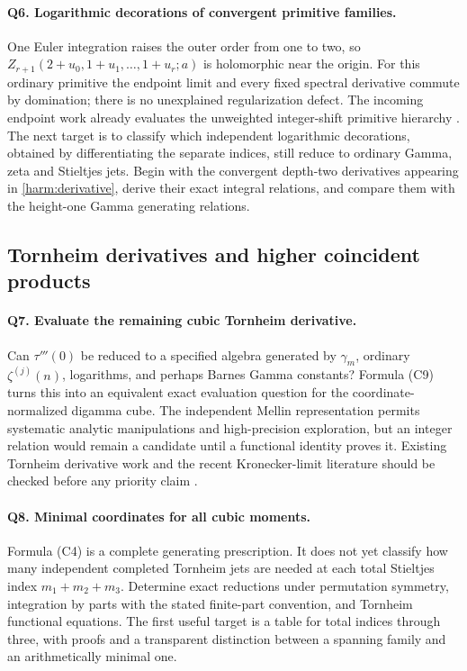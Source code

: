 \documentclass[11pt,letterpaper]{article}
\numberwithin{equation}{section}
\theoremstyle{definition}
\theoremstyle{remark}
\begin{document}
\paragraph{Q6. Logarithmic decorations of convergent primitive families.}
One Euler integration raises the outer order from one to two, so
$Z_{r+1}(2+u_0,1+u_1,\ldots,1+u_r;a)$ is holomorphic near the origin.
For this ordinary primitive the endpoint limit and every fixed
spectral derivative commute by domination; there is no unexplained
regularization defect. The incoming endpoint work already evaluates
the unweighted integer-shift primitive hierarchy
\cite{repoendpoint}. The next target is to classify which independent
logarithmic decorations, obtained by differentiating the separate
indices, still reduce to ordinary Gamma, zeta and Stieltjes jets.
Begin with the convergent depth-two derivatives appearing in
\eqref{harm:derivative}, derive their exact integral relations, and
compare them with the height-one Gamma generating relations.

\subsection{Tornheim derivatives and higher coincident products}

\paragraph{Q7. Evaluate the remaining cubic Tornheim derivative.}
Can $\tau'''(0)$ be reduced to a specified algebra generated by
$\gamma_m$, ordinary $\zeta^{(j)}(n)$, logarithms, and perhaps Barnes
Gamma constants? Formula (C9) turns this into an equivalent exact
evaluation question for the coordinate-normalized digamma cube.
The independent Mellin representation permits systematic analytic
manipulations and high-precision exploration, but an integer relation
would remain a candidate until a functional identity proves it.
Existing Tornheim derivative work and the recent Kronecker-limit
literature should be checked before any priority claim
\cite{BorweinDilcher,BaileyBorwein,Onodera2021,SS2026}.

\paragraph{Q8. Minimal coordinates for all cubic moments.}
Formula (C4) is a complete generating prescription. It does not yet
classify how many independent completed Tornheim jets are needed at
each total Stieltjes index $m_1+m_2+m_3$. Determine exact reductions
under permutation symmetry, integration by parts with the stated
finite-part convention, and Tornheim functional equations. The
first useful target is a table for total indices through three,
with proofs and a transparent distinction between a spanning family
and an arithmetically minimal one.
\end{document}
